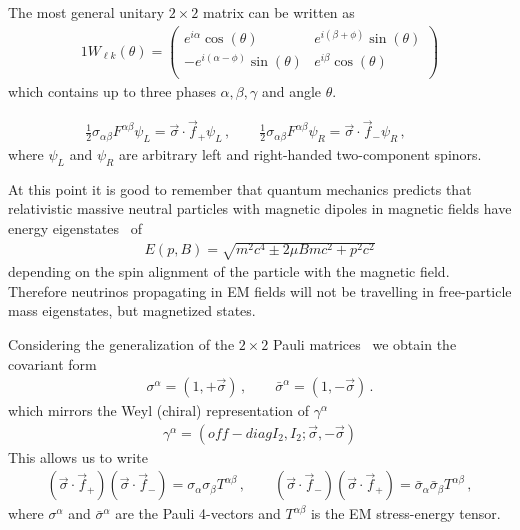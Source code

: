 The most general unitary $2\times2$ matrix can be written as
\begin{alignat}{1}
	\label{mix:4} W_{\ell k}(\theta) = 
    \left(
    \begin{array}{cc}
         e^{i \alpha } \cos (\theta ) & e^{i (\beta +\phi )} \sin (\theta ) \\
         -e^{i (\alpha -\phi )} \sin (\theta ) & e^{i \beta } \cos (\theta ) \\
    \end{array}
    \right)
\end{alignat}
which contains up to three phases $\alpha,\beta,\gamma$ and angle $\theta$.




 \begin{align}
    \label{chiral:1b}
   \frac{1}{2}\sigma_{\alpha\beta}F^{\alpha\beta}\psi_{L} = \vec{\sigma}\cdot\vec{f}_{+}\psi_{L}\,,\qquad
    \frac{1}{2}\sigma_{\alpha\beta}F^{\alpha\beta}\psi_{R} = \vec{\sigma}\cdot\vec{f}_{-}\psi_{R}\,,\qquad
\end{align}
where $\psi_{L}$ and $\psi_{R}$ are arbitrary left and right-handed two-component spinors.




At this point it is good to remember that quantum mechanics predicts that relativistic massive neutral particles with magnetic dipoles in magnetic fields have energy eigenstates~\cite{Steinmetz:2018ryf} of
\begin{align}
    \label{kgp:1}
    E(p,B) = \sqrt{m^{2}c^{4}\pm2\mu Bmc^{2}+p^{2}c^{2}}
\end{align}
depending on the spin alignment of the particle with the magnetic field. Therefore neutrinos propagating in EM fields will not be travelling in free-particle mass eigenstates, but magnetized states.




Considering the generalization of the $2\times 2$ Pauli matrices~\cite{Ohlsson:2011zz} we obtain the covariant form 
\begin{align}       \label{cross:1a}    
        \sigma^{\alpha}=(1,+\vec{\sigma})\,,\qquad
        \bar\sigma^{\alpha}=(1,-\vec{\sigma})\,.
\end{align}
which mirrors the Weyl (chiral) representation of $\gamma^\alpha$
\begin{align}       \label{cross:1c}    
\gamma^\alpha =(off-diag I_2,I_2;\vec\sigma,-\vec\sigma)
\end{align}
This allows us to write 
        \begin{align}
        \label{cross:2}        \left(\vec{\sigma}\cdot\vec{f}_{+}\right)\left(\vec{\sigma}\cdot\vec{f}_{-}\right)=\sigma_{\alpha}\sigma_{\beta}T^{\alpha\beta}\,,\qquad
        \left(\vec{\sigma}\cdot\vec{f}_{-}\right)\left(\vec{\sigma}\cdot\vec{f}_{+}\right)=\bar\sigma_{\alpha}\bar\sigma_{\beta}T^{\alpha\beta}\,,
\end{align}
where $\sigma^{\alpha}$ and $\bar\sigma^{\alpha}$ are the Pauli 4-vectors and $T^{\alpha\beta}$ is the EM stress-energy tensor.




